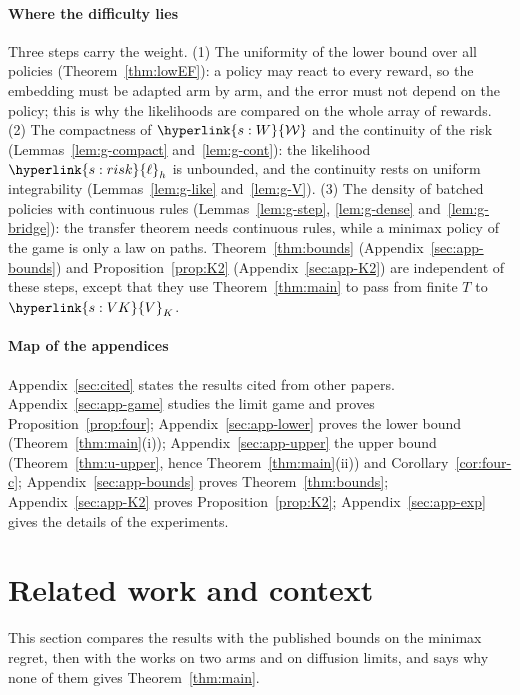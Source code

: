 \documentclass[11pt]{article}
\DeclareRobustCommand{\sy}[2]{{\hyperlink{#1}{#2}}}
\newcommand{\1}{\mathbf{1}}
\newcommand{\Wc}{\sy{s:W}{\mathcal W}}
\newcommand{\lh}{\sy{s:risk}{\ell}}
\newcommand{\VK}{\sy{s:VK}{V}}
\begin{document}
\paragraph{Where the difficulty lies} Three steps carry the weight. (1) The uniformity of the lower bound over all policies (Theorem~\ref{thm:lowEF}): a
policy may react to every reward, so the embedding must be adapted arm by arm, and the error must not depend on the policy; this is why the likelihoods are
compared on the whole array of rewards. (2) The compactness of $\Wc$ and the continuity of the risk (Lemmas~\ref{lem:g-compact} and~\ref{lem:g-cont}): the
likelihood $\lh_h$ is unbounded, and the continuity rests on uniform integrability (Lemmas~\ref{lem:g-like} and~\ref{lem:g-V}). (3) The density of batched
policies with continuous rules (Lemmas~\ref{lem:g-step}, \ref{lem:g-dense} and~\ref{lem:g-bridge}): the transfer theorem needs continuous rules, while a
minimax policy of the game is only a law on paths. Theorem~\ref{thm:bounds} (Appendix~\ref{sec:app-bounds}) and Proposition~\ref{prop:K2}
(Appendix~\ref{sec:app-K2}) are independent of these steps, except that they use Theorem~\ref{thm:main} to pass from finite $T$ to $\VK_K$.

\paragraph{Map of the appendices} Appendix~\ref{sec:cited} states the results cited from other papers. Appendix~\ref{sec:app-game} studies the limit game
and proves Proposition~\ref{prop:four}; Appendix~\ref{sec:app-lower} proves the lower bound (Theorem~\ref{thm:main}(i)); Appendix~\ref{sec:app-upper}
the upper bound (Theorem~\ref{thm:u-upper}, hence Theorem~\ref{thm:main}(ii)) and Corollary~\ref{cor:four-c}; Appendix~\ref{sec:app-bounds} proves
Theorem~\ref{thm:bounds}; Appendix~\ref{sec:app-K2} proves Proposition~\ref{prop:K2}; Appendix~\ref{sec:app-exp} gives the details of the experiments.

\section{Related work and context}\label{sec:related}

This section compares the results with the published bounds on the minimax regret, then with the works on two arms and on diffusion limits, and
says why none of them gives Theorem~\ref{thm:main}.
\end{document}
